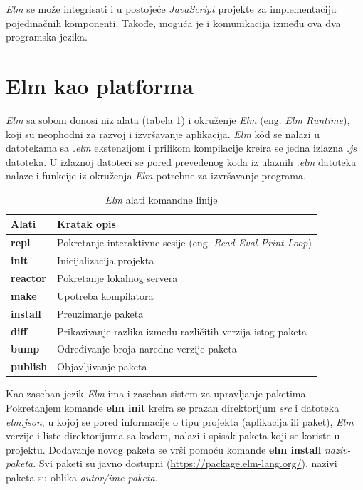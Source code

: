 \documentclass[12pt,oneside]{memoir}
\begin{document}
\emph{Elm} se može integrisati i u postojeće \emph{JavaScript} projekte za implementaciju pojedinačnih 
komponenti. Takođe, moguća je i komunikacija između ova dva programska jezika. 

\section{Elm kao platforma}
\emph{Elm} sa sobom donosi niz alata (tabela \ref{table:elmTools}) i okruženje \emph{Elm} (eng. \emph{Elm 
Runtime}), koji su neophodni za razvoj i izvršavanje aplikacija. \emph{Elm} k\^{o}d se nalazi u 
datotekama sa \emph{.elm} ekstenzijom i prilikom kompilacije kreira se jedna izlazna 
\emph{.js} datoteka. U izlaznoj datoteci se pored prevedenog koda iz ulaznih \emph{.elm} 
datoteka nalaze i funkcije iz okruženja \emph{Elm} potrebne za izvršavanje programa.

\begin{table}[h!]
\centering
\begin{tabular}{|l l|} 
 \hline 
 Alati & Kratak opis  \\ [0.5ex] 
 \hline
  \textbf{repl} & Pokretanje interaktivne sesije (eng. \emph{Read-Eval-Print-Loop}) \\ 
  \textbf{init} & Inicijalizacija projekta \\
  \textbf{reactor} & Pokretanje lokalnog servera \\
  \textbf{make} & Upotreba kompilatora \\
  \textbf{install}  & Preuzimanje paketa \\ 
  \textbf{diff} & Prikazivanje razlika između različitih verzija istog paketa \\
  \textbf{bump} & Određivanje broja naredne verzije paketa  \\
  \textbf{publish} & Objavljivanje paketa \\[1ex] 
 \hline
\end{tabular}
\caption{\emph{Elm} alati komandne linije}
\label{table:elmTools}
\end{table}

 
Kao zaseban jezik \emph{Elm} ima i zaseban sistem za upravljanje paketima.
Pokretanjem komande \textbf{elm init} kreira se prazan direktorijum \emph{src} i 
datoteka \emph{elm.json}, u kojoj se pored informacije o tipu projekta (aplikacija ili 
paket), \emph{Elm} verzije i liste direktorijuma sa kodom, nalazi i spisak paketa koji se 
koriste u projektu. Dodavanje novog paketa se vrši pomoću komande \textbf{elm install} 
\emph{naziv-paketa}. Svi paketi su javno dostupni (\url{https://package.elm-lang.org/}),
nazivi paketa su oblika \emph{autor/ime-paketa}.
\end{document}
